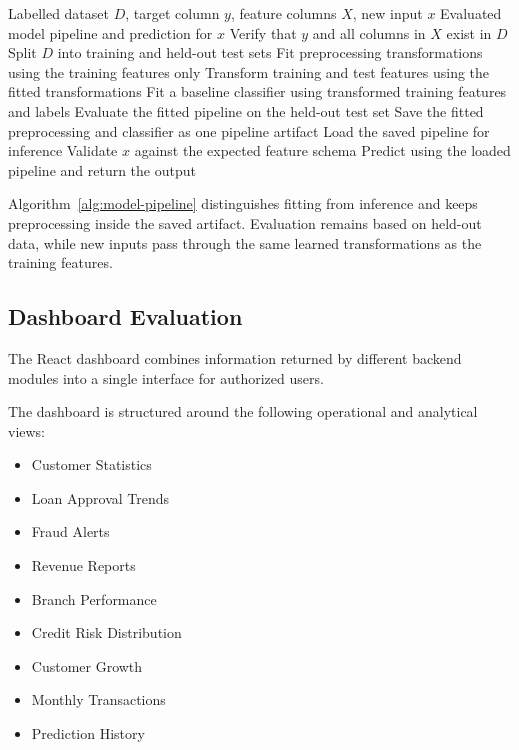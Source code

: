 \documentclass[conference]{IEEEtran}
\begin{document}
\begin{algorithm}[!t]
\caption{Supervised Model Training and Inference}
\label{alg:model-pipeline}
\begin{algorithmic}[1]
\Require Labelled dataset $D$, target column $y$, feature columns $X$, new input $x$
\Ensure Evaluated model pipeline and prediction for $x$
\State Verify that $y$ and all columns in $X$ exist in $D$
\State Split $D$ into training and held-out test sets
\State Fit preprocessing transformations using the training features only
\State Transform training and test features using the fitted transformations
\State Fit a baseline classifier using transformed training features and labels
\State Evaluate the fitted pipeline on the held-out test set
\State Save the fitted preprocessing and classifier as one pipeline artifact
\State Load the saved pipeline for inference
\State Validate $x$ against the expected feature schema
\State Predict using the loaded pipeline and return the output
\end{algorithmic}
\end{algorithm}

Algorithm~\ref{alg:model-pipeline} distinguishes fitting from inference and keeps preprocessing inside the saved artifact. Evaluation remains based on held-out data, while new inputs pass through the same learned transformations as the training features.

\subsection{Dashboard Evaluation}

The React dashboard combines information returned by different backend modules into a single interface for authorized users.

The dashboard is structured around the following operational and analytical views:

\begin{itemize}

\item Customer Statistics

\item Loan Approval Trends

\item Fraud Alerts

\item Revenue Reports

\item Branch Performance

\item Credit Risk Distribution

\item Customer Growth

\item Monthly Transactions

\item Prediction History

\end{itemize}
\end{document}
